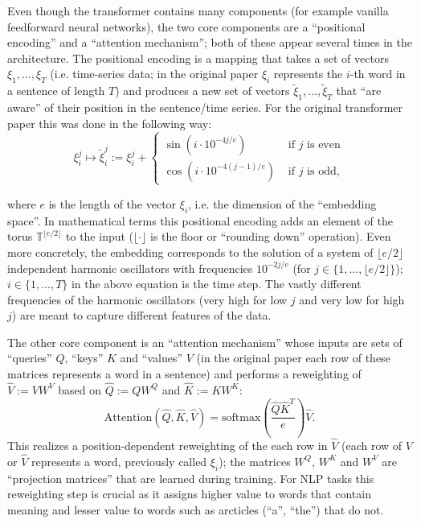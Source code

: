 \documentclass{article}
\begin{document}
Even though the transformer contains many components (for example vanilla feedforward neural networks), the two core components are a ``positional encoding'' and a ``attention mechanism''; both of these appear several times in the architecture.
The positional encoding is a mapping that takes a set of vectors $\xi_1, \ldots, \xi_T$ (i.e. time-series data; in the original paper $\xi_i$ represents the $i$-th word in a sentence of length $T$) and produces a new set of vectors $\tilde{\xi}_1, \ldots, \tilde{\xi}_T$ that ``are aware'' of their position in the sentence/time series.
For the original transformer paper this was done in the following way: 
\begin{equation}
    \xi_i^j \mapsto \tilde{\xi}_i^j := \xi_i^j + \begin{cases} \sin(i\cdot10^{-4j/e}) & \text{ if $j$ is even} \\ \cos(i\cdot10^{-4(j-1)/e}) & \text{ if $j$ is odd}, \end{cases}
    \label{eq:embedding}
\end{equation}

where $e$ is the length of the vector $\xi_i$, i.e. the dimension of the ``embedding space''. 
In mathematical terms this positional encoding adds an element of the torus $\mathbb{T}^{\lfloor{}e/2\rfloor}$ to the input ($\lfloor\cdot\rfloor$ is the floor or ``rounding down'' operation). Even more concretely, the embedding corresponds to the solution of a system of $\lfloor{}e/2\rfloor$ independent harmonic oscillators with frequencies $10^{-2j/e}$ (for $j\in\{1,\ldots,\lfloor{}e/2\rfloor\}$); $i\in\{1,\ldots,T\}$ in the above equation is the time step. The vastly different frequencies of the harmonic oscillators (very high for low $j$ and very low for high $j$) are meant to capture different features of the data. 


The other core component is an ``attention mechanism'' whose inputs are sets of ``queries'' $Q$, ``keys'' $K$ and ``values'' $V$ (in the original paper each row of these matrices represents a word in a sentence) and performs a reweighting of $\hat{V}:= VW^V$ based on $\hat{Q}:=QW^Q$ and $\hat{K}:=KW^K$:
\begin{equation}
    \mathrm{Attention}(\hat{Q},\hat{K},\hat{V}) = \mathrm{softmax}\left(\frac{\hat{Q}\hat{K}^T}{e}\right)\hat{V}.
    \label{eq:attention}
\end{equation}
This realizes a position-dependent reweighting of the each row in $\hat{V}$ (each row of $V$ or $\hat{V}$ represents a word, previously called $\xi_i$); the matrices $W^Q$, $W^K$ and $W^V$ are ``projection matrices'' that are learned during training. For NLP tasks this reweighting step is crucial as it assigns higher value to words that contain meaning and lesser value to words such as arcticles (``a'', ``the'') that do not. 
\end{document}
